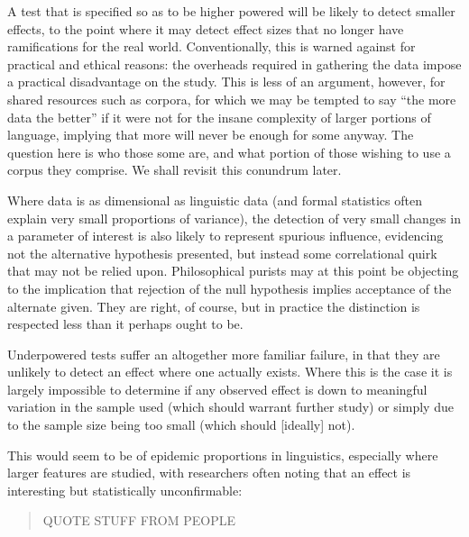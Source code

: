 A test that is specified so as to be higher powered will be likely to detect smaller effects, to the point where it may detect effect sizes that no longer have ramifications for the real world.  Conventionally, this is warned against for practical and ethical reasons: the overheads required in gathering the data impose a practical disadvantage on the study.  This is less of an argument, however, for shared resources such as corpora, for which we may be tempted to say ``the more data the better'' if it were not for the insane complexity of larger portions of language, implying that more will never be enough for some anyway.  The question here is who those some are, and what portion of those wishing to use a corpus they comprise.  We shall revisit this conundrum later.

Where data is as dimensional as linguistic data (and formal statistics often explain very small proportions of variance), the detection of very small changes in a parameter of interest is also likely to represent spurious influence, evidencing not the alternative hypothesis presented, but instead some correlational quirk that may not be relied upon.  Philosophical purists may at this point be objecting to the implication that rejection of the null hypothesis implies acceptance of the alternate given.  They are right, of course, but in practice the distinction is respected less than it perhaps ought to be.



Underpowered tests suffer an altogether more familiar failure, in that they are unlikely to detect an effect where one actually exists.  Where this is the case it is largely impossible to determine if any observed effect is down to meaningful variation in the sample used (which should warrant further study) or simply due to the sample size being too small (which should [ideally] not).

This would seem to be of epidemic proportions in linguistics, especially where larger features are studied, with researchers often noting that an effect is interesting but statistically unconfirmable:
\begin{quote}
QUOTE STUFF FROM PEOPLE
\end{quote}









